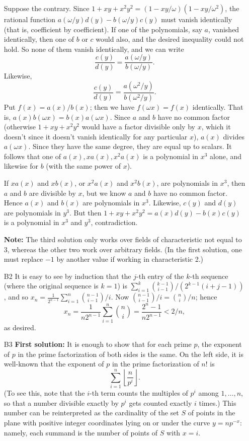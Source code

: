 \documentclass[amssymb,twocolumn,pra,10pt,aps]{revtex4-1}
\begin{document}
\begin{itemize}
Suppose the contrary.  Since $1+xy+x^2y^2 = (1 - xy/\omega)(1 -
xy/\omega^2)$, the rational function $a(\omega/y) d(y) - b(\omega/y) c(y)$
must vanish identically (that is, coefficient by coefficient).  If one of
the polynomials, say $a$, vanished identically, then one of $b$ or $c$
would also, and the desired inequality could not hold. So none of them
vanish identically, and we can write
\[
\frac{c(y)}{d(y)} = \frac{a(\omega/y)}{b(\omega/y)}.
\]
Likewise,
\[
\frac{c(y)}{d(y)}= \frac{a(\omega^2/y)}{b(\omega^2/y)}.
\]
Put $f(x) = a(x)/b(x)$; then we have $f(\omega x) = f(x)$ identically. That is,
$a(x) b(\omega x) = b(x) a(\omega x)$. Since $a$ and $b$ have no common
factor (otherwise $1+xy+x^2y^2$ would have a factor divisible only by
$x$, which it doesn't since it doesn't vanish identically for any particular
$x$), $a(x)$ divides $a(\omega x)$. Since they have the same degree, they
are equal up to scalars. It follows that one of $a(x), xa(x), x^2a(x)$
is a polynomial in $x^3$ alone, and likewise for $b$ (with the same
power of $x$).

If $xa(x)$ and $xb(x)$, or $x^2 a(x)$ and $x^2 b(x)$, are polynomials in
$x^3$, then $a$ and $b$ are divisible by $x$, but we know $a$ and $b$ have no
common factor. Hence $a(x)$ and $b(x)$ are polynomials in $x^3$. Likewise,
$c(y)$ and $d(y)$ are polynomials in $y^3$. But then $1 + xy + x^2 y^2 =
a(x)d(y) - b(x) c(y)$ is a polynomial in $x^3$ and $y^3$, contradiction.

\textbf{Note:}
The third solution only works over fields of characteristic not equal to 3,
whereas the other two work over arbitrary fields. (In the first solution,
one must replace $-1$ by another value if working in characteristic 2.)

\item[B2]
It is easy to see by induction that the $j$-th entry of the $k$-th
sequence (where the original sequence is $k=1$) is
$\sum_{i=1}^k \binom{k-1}{i-1}/(2^{k-1} (i+j-1))$, and so
$x_n = \frac{1}{2^{n-1}} \sum_{i=1}^n \binom{n-1}{i-1}/i$.
Now $\binom{n-1}{i-1}/i = \binom{n}{i}/n$; hence
\[
x_n = \frac{1}{n2^{n-1}} \sum_{i=1}^n \binom{n}{i}
= \frac{2^n-1}{n 2^{n-1}} < 2/n,
\]
as desired.


\item[B3]
\textbf{First solution:}
It is enough to show that for each prime $p$, the exponent of $p$ in
the prime factorization of both sides is the same.
On the left side, it is well-known that the exponent of $p$ in the
prime factorization of $n!$ is
\[
\sum_{i =1}^n \left\lfloor \frac{n}{p^i} \right\rfloor.
\]
(To see this, note that the $i$-th term counts the multiples of $p^i$ among
$1, \dots, n$, so that a number divisible exactly by $p^i$ gets counted
exactly $i$ times.)  This number can be reinterpreted as the cardinality
of the set $S$ of points in the plane with positive integer coordinates
lying on or under the curve $y = np^{-x}$: namely, each summand is the
number of points of $S$ with $x=i$.


\end{itemize}
\end{document}
